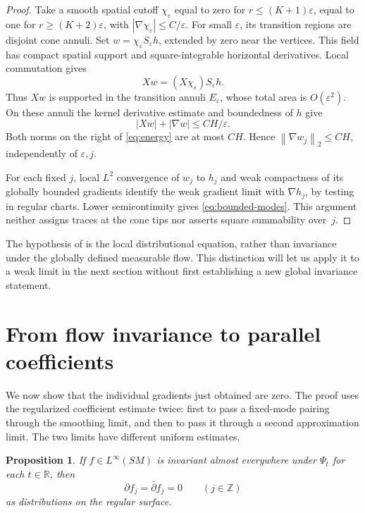 \documentclass[11pt]{article}
\newtheorem{proposition}[theorem]{Proposition}
\theoremstyle{remark}
\newcommand{\R}{\mathbb R}
\newcommand{\Z}{\mathbb Z}
\newcommand{\eps}{\varepsilon}
\newcommand{\pa}{\partial}
\newcommand{\pb}{\bar\partial}
\newcommand{\norm}[1]{\left\lVert#1\right\rVert}
\begin{document}
\begin{proof}
Take a smooth spatial cutoff \(\chi_\eps\) equal to zero for
\(r\le(K+1)\eps\), equal to one for \(r\ge(K+2)\eps\), with
\(|\nabla\chi_\eps|\le C/\eps\). For small \(\eps\), its transition
regions are disjoint cone annuli. Set
\(w=\chi_\eps S_\eps h\), extended by zero near the vertices.
This field has compact spatial support and square-integrable horizontal
derivatives. Local commutation gives
\[
 Xw=(X\chi_\eps)S_\eps h.
\]
Thus \(Xw\) is supported in the transition annuli \(E_\eps\),
whose total area is \(O(\eps^2)\). On these annuli the kernel
derivative estimate and boundedness of \(h\) give
\[
 |Xw|+|\nabla w|\le CH/\eps.
\]
Both norms on the right of \eqref{eq:energy} are at most \(CH\).
Hence \(\norm{\nabla w_j}_2\le CH\), independently of \(\eps,j\).

For each fixed \(j\), local \(L^2\) convergence of \(w_j\) to
\(h_j\) and weak compactness of its globally bounded gradients
identify the weak gradient limit with \(\nabla h_j\), by testing
in regular charts. Lower semicontinuity gives
\eqref{eq:bounded-modes}. This argument neither assigns traces at
the cone tips nor asserts square summability over~\(j\).
\end{proof}

The hypothesis of  is the local distributional
equation, rather than invariance under the globally defined measurable
flow. This distinction will let us apply it to a weak limit in the next
section without first establishing a new global invariance statement.

\section{From flow invariance to parallel coefficients}\label{sec:rigidity}

We now show that the individual gradients just obtained are zero.
The proof uses the regularized coefficient estimate twice: first to
pass a fixed-mode pairing through the smoothing limit, and then to
pass it through a second approximation limit. The two limits have
different uniform estimates.

\begin{proposition}\label{prop:rigidity}
If \(f\in L^\infty(SM)\) is invariant almost everywhere under
\(\Psi_t\) for each \(t\in\R\), then
\[
 \pa f_j=\pb f_j=0\qquad(j\in\Z)
\]
as distributions on the regular surface.
\end{proposition}
\end{document}
